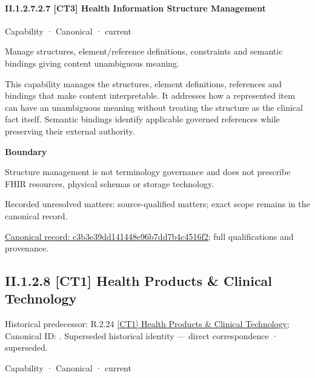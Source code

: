 \paragraph*{II.1.2.7.2.7 [CT3] Health Information Structure Management}
\label{navigation:II.1.2.7.2.7}

\label{element:c3b3e39dd141448e96b7dd7b4c4516f2}
{\small Capability · Canonical · current}\par

Manage structures, element/reference definitions, constraints and semantic bindings giving content unambiguous meaning.



This capability manages the structures, element definitions, references and bindings that make content interpretable. It addresses how a represented item can have an unambiguous meaning without treating the structure as the clinical fact itself. Semantic bindings identify applicable governed references while preserving their external authority.



\textbf{Boundary}



Structure management is not terminology governance and does not prescribe FHIR resources, physical schemas or storage technology.


{\small Recorded unresolved matters: source-qualified matters; exact scope remains in the canonical record.}\par
{\footnotesize \href{../../../../../../../continuum/strategy/capability/c3b3e39dd141448e96b7dd7b4c4516f2.md}{Canonical record: c3b3e39dd141448e96b7dd7b4c4516f2}; full qualifications and provenance.}\par
\subsection*{II.1.2.8 [CT1] Health Products \& Clinical Technology}
\label{navigation:II.1.2.8}

{\small Historical predecessor: R.2.24 \hyperref[element:a631a8600b8b49df9ef452c48c91349a]{[CT1] Health Products \& Clinical Technology}; Canonical ID: \texttt{}. Superseded historical identity — direct correspondence · superseded.}\par
\label{element:54388e3202c2403089b5c476c78c4567}
{\small Capability · Canonical · current}\par

